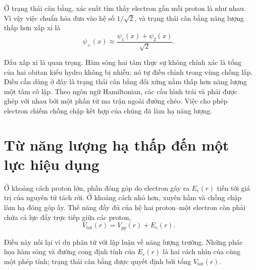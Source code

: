 Ở trạng thái cân bằng, xác suất tìm thấy electron gần mỗi proton là như nhau. Vì vậy việc chuẩn hóa đưa vào hệ số \(1/\sqrt2\), và trạng thái cân bằng năng lượng thấp hơn xấp xỉ là
\begin{equation}
\psi_+(x)\approx \frac{\psi_1(x)+\psi_2(x)}{\sqrt2}.
\end{equation}

Dấu xấp xỉ là quan trọng. Hàm sóng hai tâm thực sự không chính xác là tổng của hai obitan kiểu hydro không bị nhiễu; nó tự điều chỉnh trong vùng chồng lấp. Điều cần dùng ở đây là trạng thái cân bằng đối xứng nằm thấp hơn năng lượng một tâm cô lập. Theo ngôn ngữ Hamiltonian, các cấu hình trái và phải được ghép với nhau bởi một phần tử ma trận ngoài đường chéo. Việc cho phép electron chiếm chồng chập kết hợp của chúng đã làm hạ năng lượng.

\section{Từ năng lượng hạ thấp đến một lực hiệu dụng}

Ở khoảng cách proton lớn, phần đóng góp do electron gây ra \(E_e(r)\) tiến tới giá trị của nguyên tử tách rời. Ở khoảng cách nhỏ hơn, xuyên hầm và chồng chập làm hạ đóng góp ấy. Thế năng đầy đủ của hệ hai proton--một electron còn phải chứa cả lực đẩy trực tiếp giữa các proton,
\begin{equation}
V_{\mathrm{tot}}(r)=V_{pp}(r)+E_e(r).
\end{equation}

Điều này nối lại ví dụ phân tử với lập luận về năng lượng trường. Những phác họa hàm sóng và đường cong định tính của \(E_e(r)\) là hai cách nhìn của cùng một phép tính; trạng thái cân bằng được quyết định bởi tổng \(V_{\mathrm{tot}}(r)\).

